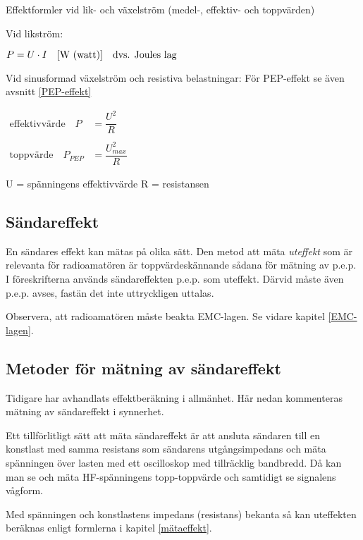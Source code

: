 Effektformler vid lik- och växelström (medel-, effektiv- och toppvärden)

Vid likström:

\(
P = U \cdot I \quad \text{[W (watt)]} \quad \text{dvs. Joules lag} \\
\)

Vid sinusformad växelström och resistiva belastningar:
För PEP-effekt se även avsnitt \ref{PEP-effekt}

\(
\begin{array}{ll}
\text{effektivvärde} \quad P & = \dfrac{U^2}{R} \\
&\\
\text{toppvärde}     \quad P_{PEP} & = \dfrac{U_{max}^2}{R}
\end{array}
\)

U = spänningens effektivvärde
R = resistansen

\subsection{Sändareffekt}

En sändares effekt kan mätas på olika sätt.
Den metod att mäta \emph{uteffekt} som är relevanta för radioamatören är
toppvärdeskännande sådana för mätning av p.e.p.
I föreskrifterna används sändareffekten p.e.p. som uteffekt.
Därvid måste även p.e.p. avses, fastän det inte uttryckligen uttalas.

Observera, att radioamatören måste beakta EMC-lagen.
Se vidare kapitel \ref{EMC-lagen}.

\subsection{Metoder för mätning av sändareffekt}

Tidigare har avhandlats effektberäkning i allmänhet.
Här nedan kommenteras mätning av sändareffekt i synnerhet.

Ett tillförlitligt sätt att mäta sändareffekt är att ansluta sändaren
till en konstlast med samma resistans som sändarens utgångsimpedans
och mäta spänningen över lasten med ett oscilloskop med tillräcklig bandbredd.
Då kan man se och mäta HF-spänningens topp-toppvärde och samtidigt se
signalens vågform.

Med spänningen och konstlastens impedans (resistans) bekanta så kan
uteffekten beräknas enligt formlerna i kapitel \ref{mätaeffekt}.

